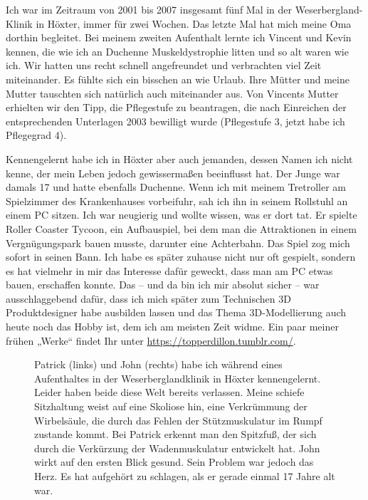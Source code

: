 \documentclass[fontsize=14pt,a4paper,headinclude,DIV=calc,automark]{scrbook}
\begin{document}
Ich war im Zeitraum von 2001 bis 2007 insgesamt fünf Mal in der Weserbergland-Klinik in Höxter, immer für zwei Wochen. Das letzte Mal hat mich meine Oma dorthin begleitet. Bei meinem zweiten Aufenthalt lernte ich Vincent und Kevin kennen, die wie ich an Duchenne Muskeldystrophie litten und so alt waren wie ich. Wir hatten uns recht schnell angefreundet und verbrachten viel Zeit miteinander. Es fühlte sich ein bisschen an wie Urlaub. Ihre Mütter und meine Mutter tauschten sich natürlich auch miteinander aus. Von Vincents Mutter erhielten wir den Tipp, die Pflegestufe zu beantragen, die nach Einreichen der entsprechenden Unterlagen 2003 bewilligt wurde (Pflegestufe 3, jetzt habe ich Pflegegrad 4).

Kennengelernt habe ich in Höxter aber auch jemanden, dessen Namen ich nicht kenne, der mein Leben jedoch gewissermaßen beeinflusst hat. Der Junge war damals 17 und hatte ebenfalls Duchenne. Wenn ich mit meinem Tretroller am Spielzimmer des Krankenhauses vorbeifuhr, sah ich ihn in seinem Rollstuhl an einem PC sitzen. Ich war neugierig und wollte wissen, was er dort tat. Er spielte Roller Coaster Tycoon, ein Aufbauspiel, bei dem man die Attraktionen in einem Vergnügungspark bauen musste, darunter eine Achterbahn. Das Spiel zog mich sofort in seinen Bann. Ich habe es später zuhause nicht nur oft gespielt, sondern es hat vielmehr in mir das Interesse dafür geweckt, dass man am PC etwas bauen, erschaffen konnte. Das – und da bin ich mir absolut sicher – war ausschlaggebend dafür, dass ich mich später zum Technischen 3D Produktdesigner habe ausbilden lassen und das Thema 3D-Modellierung auch heute noch das Hobby ist, dem ich am meisten Zeit widme. Ein paar meiner frühen „Werke“ findet Ihr unter \url{https://topperdillon.tumblr.com/}.

\setlength{\fboxsep}{0pt}    %
\setlength{\fboxrule}{0.2pt} %
\begin{figure}[H]
    \centering
    \caption{Patrick (links) und John (rechts) habe ich während eines Aufenthaltes in der Weserberglandklinik in Höxter kennengelernt. Leider haben beide diese Welt bereits verlassen. Meine schiefe Sitzhaltung weist auf eine Skoliose hin, eine Verkrümmung der Wirbelsäule, die durch das Fehlen der Stützmuskulatur im Rumpf zustande kommt. Bei Patrick erkennt man den Spitzfuß, der sich durch die Verkürzung der Wadenmuskulatur entwickelt hat. John wirkt auf den ersten Blick gesund. Sein Problem war jedoch das Herz. Es hat aufgehört zu schlagen, als er gerade einmal 17 Jahre alt war.}
    \label{fig:patrick_john_und_ich}
\end{figure}
\end{document}
